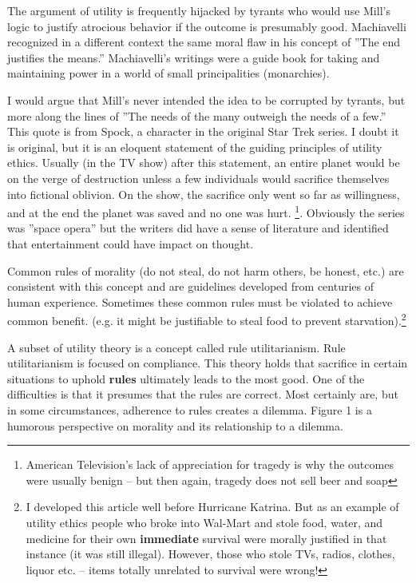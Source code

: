 \begin{enumerate}
The argument of utility is frequently hijacked by tyrants who would use Mill's logic to justify atrocious behavior if the outcome is presumably good.  Machiavelli recognized in a different context the same moral flaw in his concept of  ''The end justifies the means.''   Machiavelli's  writings were a guide book for taking and maintaining power in a world of small principalities (monarchies).  

I would argue that Mill's never intended the idea to be corrupted by tyrants, but more along the lines of ''The needs of the many outweigh the needs of a few.''  This quote is from Spock, a character in the original  Star Trek series.  I doubt it is original, but it is an eloquent statement of the guiding principles of utility ethics.  Usually (in the TV show) after this statement, an entire planet would be on the verge of destruction unless a few individuals would sacrifice themselves into fictional oblivion.  On the show, the sacrifice only went so far as willingness, and at the end the planet was saved and no one was hurt. \footnote{American Television's  lack of appreciation for tragedy is why the outcomes were usually benign -- but then again, tragedy does not sell beer and soap}.  Obviously the series was ''space opera'' but the writers did have a sense of literature and identified that entertainment could have impact on thought.

Common rules of morality (do not steal, do not harm others, be honest, etc.) are consistent with this concept and are guidelines developed from centuries of human experience.  Sometimes these common rules must be violated to achieve common benefit. (e.g. it might be justifiable to steal food to prevent starvation).\footnote{I developed this article well before Hurricane Katrina. But as an example of utility ethics people who broke into Wal-Mart and stole food, water, and medicine for their own \textbf{immediate} survival were morally justified in that instance (it was still illegal).  However, those who stole TVs, radios, clothes, liquor etc. --  items totally unrelated to survival were wrong!}

A subset of utility theory is a concept called rule utilitarianism.  Rule utilitarianism is focused on compliance.  This theory holds that sacrifice in certain situations to uphold \textbf{rules} ultimately leads to the most good.  One of the difficulties is that it presumes that the rules are correct.  Most certainly are, but in some circumstances, adherence to rules creates a dilemma.  Figure 1 is a humorous perspective on morality and its relationship to a dilemma. 
 

\end{enumerate}
